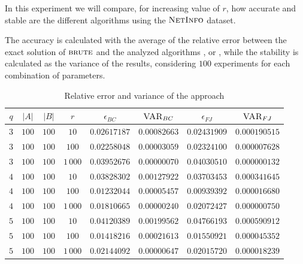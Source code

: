 In this experiment we will compare, for increasing value of $r$, how accurate and stable are the different algorithms using the $\textsc{NetInfo}$ dataset.\medskip

The accuracy is calculated with the average of the relative error between the exact solution of $\textsc{brute}$ and the analyzed algorithms \fcount, \fsamp or \base, while the stability is calculated as the variance of the results, considering $100$ experiments for each combination of parameters.

\begin{table}[ht]
	\centering
	\begin{tabular}{|c|c|c|c|c|c|c|c|}
		\hline
		$q$ & $|A|$ & $|B|$ & $r$      & $\epsilon_{BC}$ & $\textsc{VAR}_{BC}$ & $\epsilon_{FJ}$ & $\textsc{VAR}_{FJ}$ \\ \hline \hline
		$3$ & $100$ & $100$ & $10$     & $0.02617187$    & $0.00082663$        & $0.02431909$    & $0.000190515$       \\ \hline
		$3$ & $100$ & $100$ & $100$    & $0.02258048$    & $0.00003059$        & $0.02324100$    & $0.000007628$       \\ \hline
		$3$ & $100$ & $100$ & $1\,000$ & $0.03952676$    & $0.00000070$        & $0.04030510$    & $0.000000132$       \\ \hline \hline
		$4$ & $100$ & $100$ & $10$     & $0.03828302$    & $0.00127922$        & $0.03703453$    & $0.000341645$       \\ \hline
		$4$ & $100$ & $100$ & $100$    & $0.01232044$    & $0.00005457$        & $0.00939392$    & $0.000016680$       \\ \hline
		$4$ & $100$ & $100$ & $1\,000$ & $0.01810665$    & $0.00000240$        & $0.02072427$    & $0.000000750$       \\ \hline \hline
		$5$ & $100$ & $100$ & $10$     & $0.04120389$    & $0.00199562$        & $0.04766193$    & $0.000590912$       \\ \hline
		$5$ & $100$ & $100$ & $100$    & $0.01418216$    & $0.00021613$        & $0.01550921$    & $0.000045352$       \\ \hline
		$5$ & $100$ & $100$ & $1\,000$ & $0.02144092$    & $0.00000647$        & $0.02015720$    & $0.000018239$       \\ \hline
		
	\end{tabular}
	\caption{Relative error and variance of the \fcount approach}	
\end{table}

